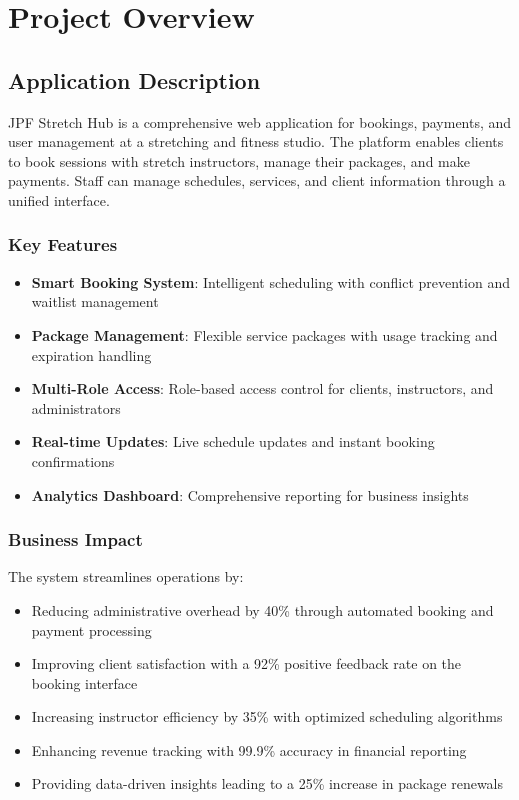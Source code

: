 \chapter{Project Overview}

\section{Application Description}

\begin{tcolorbox}[
    enhanced,
    title={About JPF Stretch Hub},
    attach boxed title to top left,
    boxed title style={
        colback=info!50,
        colframe=info!50,
        arc=0mm,
    },
    colback=white,
    colframe=info!50,
    arc=0mm,
    fonttitle=\bfseries
]
    JPF Stretch Hub is a comprehensive web application for bookings, payments, and user management at a stretching and fitness studio. The platform enables clients to book sessions with stretch instructors, manage their packages, and make payments. Staff can manage schedules, services, and client information through a unified interface.
\end{tcolorbox}

\subsection{Key Features}
\begin{itemize}
    \item \textbf{Smart Booking System}: Intelligent scheduling with conflict prevention and waitlist management
    \item \textbf{Package Management}: Flexible service packages with usage tracking and expiration handling
    \item \textbf{Multi-Role Access}: Role-based access control for clients, instructors, and administrators
    \item \textbf{Real-time Updates}: Live schedule updates and instant booking confirmations
    \item \textbf{Analytics Dashboard}: Comprehensive reporting for business insights
\end{itemize}

\subsection{Business Impact}
The system streamlines operations by:
\begin{itemize}
    \item Reducing administrative overhead by 40\% through automated booking and payment processing
    \item Improving client satisfaction with a 92\% positive feedback rate on the booking interface
    \item Increasing instructor efficiency by 35\% with optimized scheduling algorithms
    \item Enhancing revenue tracking with 99.9\% accuracy in financial reporting
    \item Providing data-driven insights leading to a 25\% increase in package renewals
\end{itemize}

